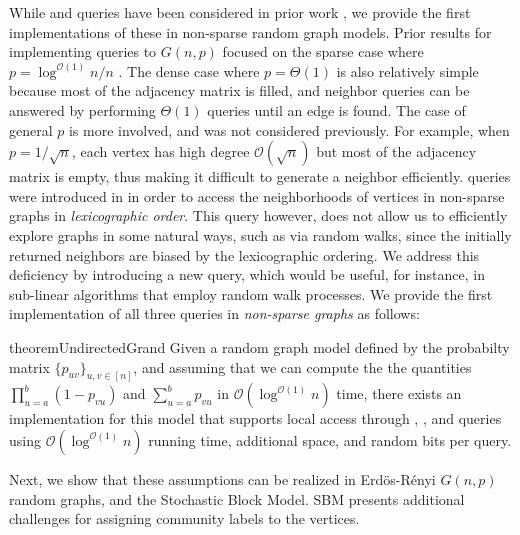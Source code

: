 While  and  queries %
have been considered in prior work \cite{reut, huge_old, sparse},
we provide the first implementations of these in non-sparse random graph models.
Prior results for implementing queries to $G(n,p)$ focused on the sparse case where $p = \log^{\mathcal O(1)} n/n$ \cite{sparse}.
The dense case where $p = \Theta(1)$ is also relatively simple because most of the adjacency matrix is filled,
and neighbor queries can be answered by performing $\Theta(1)$  queries until an edge is found.
The case of general $p$ is more involved, and was not considered previously.
For example, when $p = 1/\sqrt{n}$, each vertex has high degree $\mathcal O(\sqrt{n})$ but most of the adjacency matrix is empty,
thus making it difficult to generate a neighbor efficiently.
 queries were introduced in \cite{reut}
in order to access the neighborhoods of vertices in non-sparse graphs in \emph{lexicographic order}.
This query however, does not allow us to efficiently explore graphs in some natural ways, such as via random walks,
since the initially returned neighbors are biased by the lexicographic ordering.
We address this deficiency by introducing a new  query,
which would be useful, for instance, in sub-linear algorithms that employ random walk processes.
We provide the first implementation of all three queries in \emph{non-sparse graphs} as follows:

\begin{restatable}{theorem}{UndirectedGrand}
\label{thm:grand}
Given a random graph model defined by the probabilty matrix $\{ p_{uv}\}_{u,v\in [n]}$,
and assuming that we can compute the the quantities $\prod_{u=a}^b (1-p_{vu})$ and $\sum_{u=a}^b p_{vu}$ in $\mathcal O(\log^{\mathcal O(1)} n)$ time,
there exists an implementation for this model that supports local access through , ,
and  queries using $\mathcal O(\log^{\mathcal O(1)} n)$ running time, additional space, and random bits per query.
\end{restatable}

Next, we show that these assumptions can be realized in Erd\"os-R\'enyi $G(n,p)$ random graphs, and the Stochastic Block Model.
SBM presents additional challenges for assigning community labels to the vertices.



